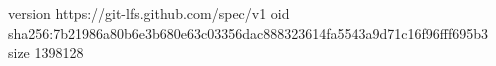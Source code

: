 version https://git-lfs.github.com/spec/v1
oid sha256:7b21986a80b6e3b680e63c03356dac888323614fa5543a9d71c16f96fff695b3
size 1398128
